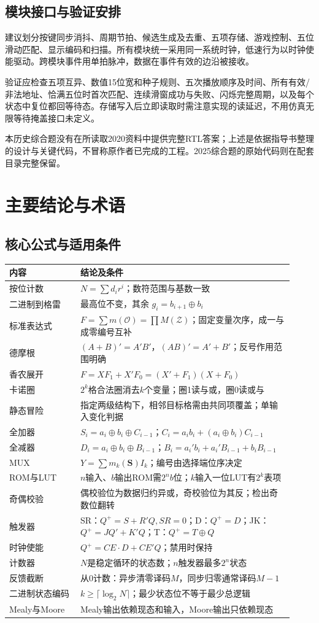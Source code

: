 \documentclass[UTF8,fontset=none,zihao=-4,a4paper]{ctexart}
\newcommand{\chapterpage}[1]{\clearpage\section{#1}}
\begin{document}
\subsection{模块接口与验证安排}
建议划分按键同步消抖、周期节拍、候选生成及去重、五项存储、游戏控制、五位滑动匹配、显示编码和扫描。所有模块统一采用同一系统时钟，低速行为以时钟使能驱动。跨模块事件用单拍脉冲，数据在事件有效的边沿被接收。

验证应检查五项互异、数值15位宽和种子规则、五次播放顺序及时间、所有有效/非法地址、恰满五位时首次匹配、连续滑窗成功与失败、闪烁完整周期，以及每个状态中复位都回等待态。存储写入后立即读取时需注意实现的读延迟，不用仿真无限等待掩盖接口未定义。

本历史综合题没有在所读取2020资料中提供完整RTL答案；上述是依据指导书整理的设计与关键代码，不冒称原作者已完成的工程。2025综合题的原始代码则在配套目录完整保留。

\chapterpage{主要结论与术语}
\subsection{核心公式与适用条件}
\begin{longtable}{p{0.23\linewidth}p{0.69\linewidth}}
\toprule 内容 & 结论及条件\\\midrule\endhead
按位计数 & $N=\sum d_ir^i$；数符范围与基数一致\\
二进制到格雷 & 最高位不变，其余 $g_i=b_{i+1}\oplus b_i$\\
标准表达式 & $F=\sum m(\mathcal O)=\prod M(\mathcal Z)$；固定变量次序，成一与成零编号互补\\
德摩根 & $(A+B)'=A'B'$，$(AB)'=A'+B'$；反号作用范围明确\\
香农展开 & $F=XF_1+X'F_0=(X'+F_1)(X+F_0)$\\
卡诺圈 & $2^k$格合法圈消去$k$个变量；圈1读与或，圈0读或与\\
静态冒险 & 指定两级结构下，相邻目标格需由共同项覆盖；单输入变化判据\\
全加器 & $S_i=a_i\oplus b_i\oplus C_{i-1}$；$C_i=a_ib_i+(a_i\oplus b_i)C_{i-1}$\\
全减器 & $D_i=a_i\oplus b_i\oplus B_{i-1}$；$B_i=a_i'b_i+a_i'B_{i-1}+b_iB_{i-1}$\\
MUX & $Y=\sum m_k(\symbf S)I_k$；编号由选择端位序决定\\
ROM与LUT & $n$输入、$b$输出ROM需$2^n b$位；$k$输入一位LUT有$2^k$表项\\
奇偶校验 & 偶校验位为数据归约异或，奇校验位为其反；检出奇数位翻转\\
触发器 & SR：$Q^+=S+R'Q,SR=0$；D：$Q^+=D$；JK：$Q^+=JQ'+K'Q$；T：$Q^+=T\oplus Q$\\
时钟使能 & $Q^+=CE\cdot D+CE'Q$；禁用时保持\\
计数器 & $N$是稳定循环的状态数；$n$触发器最多$2^n$状态\\
反馈截断 & 从0计数：异步清零译码$M$，同步归零通常译码$M-1$\\
二进制状态编码 & $k\ge\lceil\log_2N\rceil$；最少状态位不等于最少总逻辑\\
Mealy与Moore & Mealy输出依赖现态和输入，Moore输出只依赖现态\\\bottomrule
\end{longtable}
\end{document}
